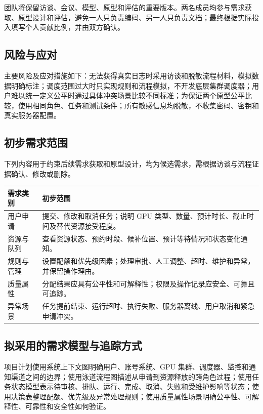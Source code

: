 \documentclass[UTF8,10.5pt,a4paper,fontset=mac]{ctexart}
\begin{document}
团队将保留访谈、会议、模型、原型和评估的重要版本。两名成员均参与需求获取、原型设计和评估，避免一人只负责编码、另一人只负责文档；最终根据实际投入填写个人贡献比例，并由双方确认。

\subsection{风险与应对}

主要风险及应对措施如下：无法获得真实日志时采用访谈和脱敏流程材料，模拟数据明确标注；调度范围过大时只实现规则和流程模拟，不开发底层集群调度器；用户难以统一定义公平时通过具体冲突场景比较不同标准；为保证两个原型公平比较，使用相同角色、任务和测试条件；所有敏感信息均脱敏，不收集密码、密钥和真实服务器配置。

\subsection{初步需求范围}

下列内容用于约束后续需求获取和原型设计，均为候选需求，需根据访谈与流程证据确认、修改或删除。

\begin{table}[htbp]
\centering
\small
\begin{tabularx}{\linewidth}{L{2.15cm}Y}
\toprule
\textbf{需求类别} & \textbf{初步范围} \\
\midrule
用户申请 & 提交、修改和取消任务；说明 GPU 类型、数量、预计时长、截止时间及替代资源接受程度。 \\
资源与队列 & 查看资源状态、预约时段、候补位置、预计等待情况和状态变化通知。 \\
规则与管理 & 设置配额和优先级因素；处理审批、人工调整、超时、维护和异常，并保留操作理由。 \\
质量属性 & 分配结果应具有公平性和可解释性；权限及操作记录应安全、可靠且可追踪。 \\
异常场景 & 任务提前结束、运行超时、执行失败、服务器离线、用户取消和紧急申请冲突。 \\
\bottomrule
\end{tabularx}
\end{table}

\subsection{拟采用的需求模型与追踪方式}

项目计划使用系统上下文图明确用户、账号系统、GPU 集群、调度器、监控和通知渠道之间的边界；使用泳道流程图描述从申请到资源释放的跨角色过程；使用任务状态模型表示待审核、排队、运行、完成、取消、失败和受维护影响等状态；使用决策表整理配额、优先级及异常处理规则；使用质量属性场景明确公平性、可解释性、可靠性和安全性如何验证。
\end{document}
